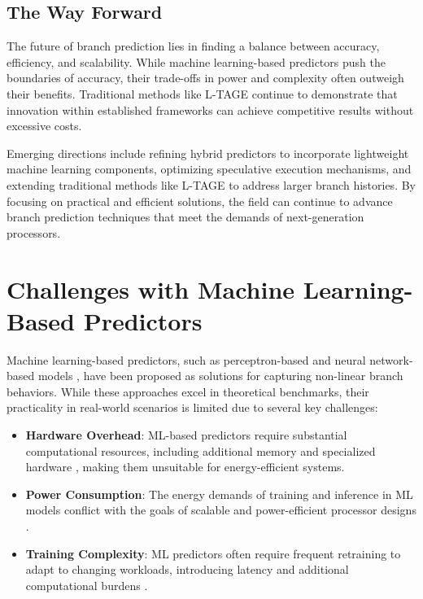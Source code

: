 \documentclass[10pt,journal,compsoc]{IEEEtran}
\begin{document}
\subsection*{The Way Forward}

The future of branch prediction lies in finding a balance between accuracy, efficiency, and scalability. While machine learning-based predictors push the boundaries of accuracy, their trade-offs in power and complexity often outweigh their benefits. Traditional methods like L-TAGE continue to demonstrate that innovation within established frameworks can achieve competitive results without excessive costs.

Emerging directions include refining hybrid predictors to incorporate lightweight machine learning components, optimizing speculative execution mechanisms, and extending traditional methods like L-TAGE to address larger branch histories. By focusing on practical and efficient solutions, the field can continue to advance branch prediction techniques that meet the demands of next-generation processors.

\section{Challenges with Machine Learning-Based Predictors}\label{challenges}

Machine learning-based predictors, such as perceptron-based \cite{seznecPerceptronBranchPredictor2001} and neural network-based models \cite{josephSurveyDeepLearning2021a}, have been proposed as solutions for capturing non-linear branch behaviors. While these approaches excel in theoretical benchmarks, their practicality in real-world scenarios is limited due to several key challenges:

\begin{itemize}
    \item \textbf{Hardware Overhead}: ML-based predictors require substantial computational resources, including additional memory and specialized hardware \cite{seznec64KbytesISLTAGE,josephSurveyDeepLearning2021a}, making them unsuitable for energy-efficient systems.
    \item \textbf{Power Consumption}: The energy demands of training and inference in ML models conflict with the goals of scalable and power-efficient processor designs \cite{penneySurveyMachineLearning2019a}.
    \item \textbf{Training Complexity}: ML predictors often require frequent retraining to adapt to changing workloads, introducing latency and additional computational burdens \cite{seznecTAGESCBranchPredictorsAgain2016}.
\end{itemize}
\end{document}
